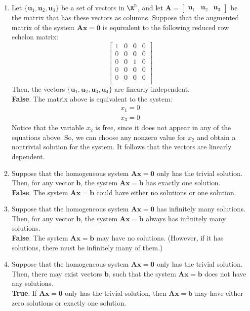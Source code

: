 \documentclass[12pt]{article}
\begin{document}
\begin{enumerate}
\item Let $\{\mathbf{u}_1, \mathbf{u}_2, \mathbf{u}_3\}$ be a set of vectors in $\R^5$, and let
$\mathbf{A}=[\begin{matrix} \mathbf{u}_1&\mathbf{u}_2&\mathbf{u}_3\end{matrix}]$ be the matrix that has these vectors as columns. 
Suppose that the augmented matrix of the system $\mathbf{A}\mathbf{x}=\mathbf{0}$ is equivalent to the following reduced row echelon matrix:
\[
\left[\begin{matrix}
1&0&0&0\\ 
0&0&0&0\\ 
0&0&1&0\\ 
0&0&0&0\\ 
0&0&0&0\\ 
\end{matrix}\right]
\]
Then, the vectors $\{\mathbf{u}_1, \mathbf{u}_2, \mathbf{u}_3, \mathbf{u}_4\}$ are linearly independent.\\
\textbf{False}. The matrix above is equivalent to the system:
\[
\begin{matrix}
x_1=0\\x_3=0
\end{matrix}
\]
Notice that the variable $x_2$ is free, since it does not appear in any of the equations above. So, we can choose any nonzero value for $x_2$ and obtain a nontrivial solution for the system. It follows that the vectors are linearly dependent.

\item Suppose that the homogeneous system $\mathbf{A}\mathbf{x}=\mathbf{0}$ only has the trivial solution. Then, for any vector $\mathbf{b}$, the system $\mathbf{A}\mathbf{x}=\mathbf{b}$ has exactly one solution.\\
\textbf{False}. The system $\mathbf{A}\mathbf{x}=\mathbf{b}$ could have either no solutions or one solution.

\item Suppose that the homogeneous system $\mathbf{A}\mathbf{x}=\mathbf{0}$ has infinitely many solutions. Then, for any vector $\mathbf{b}$, the system $\mathbf{A}\mathbf{x}=\mathbf{b}$ always has infinitely many solutions.\\
\textbf{False}. The system $\mathbf{A}\mathbf{x}=\mathbf{b}$ may have no solutions. (However, if it has solutions, there must be infinitely many of them.)

\item Suppose that the homogeneous system $\mathbf{A}\mathbf{x}=\mathbf{0}$ only has the trivial solution. Then, there may exist vectors $\mathbf{b}$, such that the system $\mathbf{A}\mathbf{x}=\mathbf{b}$ does not have any solutions.\\
\textbf{True}. If $\mathbf{A}\mathbf{x}=\mathbf{0}$ only has the trivial solution, then $\mathbf{A}\mathbf{x}=\mathbf{b}$
may have either zero solutions or exactly one solution.

\end{enumerate}
\end{document}
